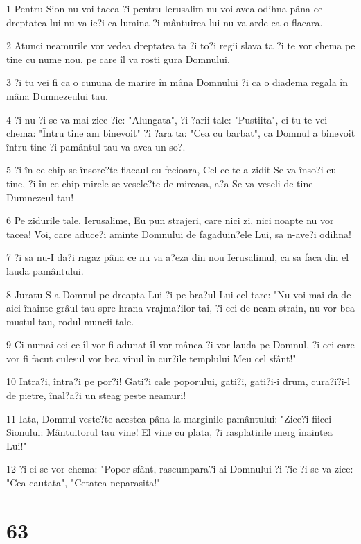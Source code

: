\par 1 Pentru Sion nu voi tacea ?i pentru Ierusalim nu voi avea odihna pâna ce dreptatea lui nu va ie?i ca lumina ?i mântuirea lui nu va arde ca o flacara.
\par 2 Atunci neamurile vor vedea dreptatea ta ?i to?i regii slava ta ?i te vor chema pe tine cu nume nou, pe care îl va rosti gura Domnului.
\par 3 ?i tu vei fi ca o cununa de marire în mâna Domnului ?i ca o diadema regala în mâna Dumnezeului tau.
\par 4 ?i nu ?i se va mai zice ?ie: "Alungata", ?i ?arii tale: "Pustiita", ci tu te vei chema: "Întru tine am binevoit" ?i ?ara ta: "Cea cu barbat", ca Domnul a binevoit întru tine ?i pamântul tau va avea un so?.
\par 5 ?i în ce chip se însore?te flacaul cu fecioara, Cel ce te-a zidit Se va înso?i cu tine, ?i în ce chip mirele se vesele?te de mireasa, a?a Se va veseli de tine Dumnezeul tau!
\par 6 Pe zidurile tale, Ierusalime, Eu pun strajeri, care nici zi, nici noapte nu vor tacea! Voi, care aduce?i aminte Domnului de fagaduin?ele Lui, sa n-ave?i odihna!
\par 7 ?i sa nu-I da?i ragaz pâna ce nu va a?eza din nou Ierusalimul, ca sa faca din el lauda pamântului.
\par 8 Juratu-S-a Domnul pe dreapta Lui ?i pe bra?ul Lui cel tare: "Nu voi mai da de aici înainte grâul tau spre hrana vrajma?ilor tai, ?i cei de neam strain, nu vor bea mustul tau, rodul muncii tale.
\par 9 Ci numai cei ce îl vor fi adunat îl vor mânca ?i vor lauda pe Domnul, ?i cei care vor fi facut culesul vor bea vinul în cur?ile templului Meu cel sfânt!"
\par 10 Intra?i, întra?i pe por?i! Gati?i cale poporului, gati?i, gati?i-i drum, cura?i?i-l de pietre, înal?a?i un steag peste neamuri!
\par 11 Iata, Domnul veste?te acestea pâna la marginile pamântului: "Zice?i fiicei Sionului: Mântuitorul tau vine! El vine cu plata, ?i rasplatirile merg înaintea Lui!"
\par 12 ?i ei se vor chema: "Popor sfânt, rascumpara?i ai Domnului ?i ?ie ?i se va zice: "Cea cautata", "Cetatea neparasita!"

\chapter{63}

